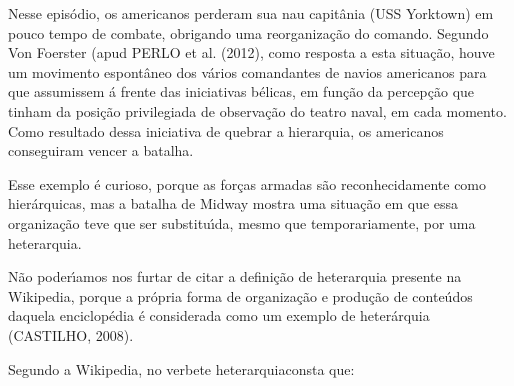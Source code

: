 \documentclass[
12pt,		%
openright,	%
twoside,  %
a4paper,			%
chapter=TITLE,		%
english,			%
french,				%
spanish,			%
brazil				%
]{USPSC-classe/USPSC}
\begin{document}
Nesse epis\'odio, os americanos perderam sua nau capit\^ania (USS Yorktown) em pouco tempo de combate, obrigando uma reorganiza\c{c}\~ao do comando. Segundo Von Foerster (apud PERLO et al. (2012), como resposta a esta situa\c{c}\~ao, houve um movimento espont\^aneo dos v\'arios comandantes de navios americanos para que assumissem \'a frente das iniciativas b\'elicas, em fun\c{c}\~ao da percep\c{c}\~ao que tinham da posi\c{c}\~ao privilegiada de observa\c{c}\~ao do teatro naval, em cada momento. Como resultado dessa iniciativa de \textquotedbl quebrar a hierarquia\textquotedbl , os americanos conseguiram vencer a batalha.

















Esse exemplo \'e curioso, porque as for\c{c}as armadas s\~ao reconhecidamente como hier\'arquicas, mas a batalha de Midway mostra uma situa\c{c}\~ao em que essa organiza\c{c}\~ao teve que ser substitu\'{\i}da, mesmo que temporariamente, por uma heterarquia.

















N\~ao poder\'{\i}amos nos furtar de citar a defini\c{c}\~ao de heterarquia presente na Wikipedia, porque a pr\'opria forma de organiza\c{c}\~ao e produ\c{c}\~ao de conte\'udos daquela enciclop\'edia \'e considerada como um exemplo de heter\'arquia  (CASTILHO, 2008).

















Segundo a Wikipedia, no verbete \textquotedbl heterarquia\textquotedbl  consta que:
\end{document}
